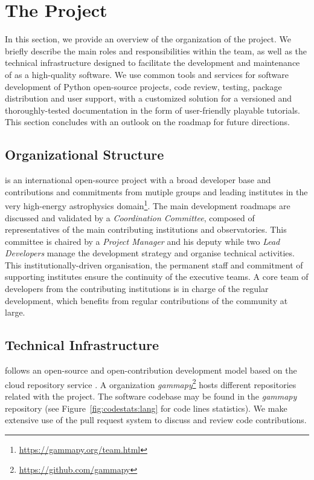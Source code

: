 \documentclass[longauth]{aa}
\begin{document}
\section{The \gammapy Project} \label{sec:gammapy-project}

In this section, we provide an overview of the organization of the \gammapy
project. We briefly describe the main roles and responsibilities within the
team, as well as the technical infrastructure designed to facilitate the
development and maintenance of \gammapy as a high-quality software. We use
common tools and services for software development of Python open-source
projects, code review, testing, package distribution and user support, with a
customized solution for a versioned and thoroughly-tested documentation in the form
of user-friendly playable tutorials. This section concludes with an outlook on
the roadmap for future directions.

\subsection{Organizational Structure}
\label{ssec:organizational-structure}

\gammapy is an international open-source project with a broad
developer base and contributions and commitments from mutiple groups and
leading institutes in the very high-energy astrophysics
domain\footnote{\url{https://gammapy.org/team.html}}. The main development
roadmaps are discussed and validated by a \textit{Coordination Committee}, composed of
representatives of the main contributing institutions and observatories.
This committee is
chaired by a \textit{Project Manager} and his deputy while two \textit{Lead Developers} manage
the development strategy and organise technical activities. This
institutionally-driven organisation, the permanent staff and commitment of
supporting institutes ensure the continuity of the executive teams. A core team
of developers from the contributing institutions is in charge of the regular
development, which benefits from regular contributions of the community at
large.

\subsection{Technical Infrastructure}
\label{ssec:technical-infrastructure}

\gammapy follows an open-source and open-contribution development model based on
the cloud repository service \github. A \github organization
\textit{gammapy}\footnote{\url{https://github.com/gammapy}} hosts different
repositories related with the project. The software codebase may be found in
the \textit{gammapy} repository (see
Figure~\ref{fig:codestats:lang} for code lines statistics). We make extensive
use of the pull request system to discuss and review code contributions.
\end{document}
